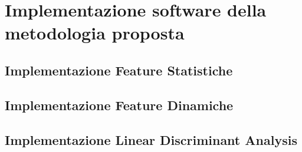 
\chapter[Implementazione Software]{Implementazione software della metodologia proposta}\label{chap6:SW_IMP_MET}
\section{Implementazione Feature Statistiche}


\section{Implementazione Feature Dinamiche}


\section{Implementazione Linear Discriminant Analysis}